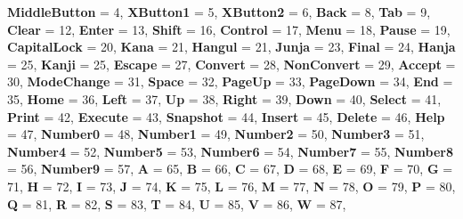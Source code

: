 \begin{DoxyCompactItemize}
{\bfseries Middle\+Button} = 4, 
{\bfseries X\+Button1} = 5, 
{\bfseries X\+Button2} = 6, 
{\bfseries Back} = 8, 
\newline
{\bfseries Tab} = 9, 
{\bfseries Clear} = 12, 
{\bfseries Enter} = 13, 
{\bfseries Shift} = 16, 
\newline
{\bfseries Control} = 17, 
{\bfseries Menu} = 18, 
{\bfseries Pause} = 19, 
{\bfseries Capital\+Lock} = 20, 
\newline
{\bfseries Kana} = 21, 
{\bfseries Hangul} = 21, 
{\bfseries Junja} = 23, 
{\bfseries Final} = 24, 
\newline
{\bfseries Hanja} = 25, 
{\bfseries Kanji} = 25, 
{\bfseries Escape} = 27, 
{\bfseries Convert} = 28, 
\newline
{\bfseries Non\+Convert} = 29, 
{\bfseries Accept} = 30, 
{\bfseries Mode\+Change} = 31, 
{\bfseries Space} = 32, 
\newline
{\bfseries Page\+Up} = 33, 
{\bfseries Page\+Down} = 34, 
{\bfseries End} = 35, 
{\bfseries Home} = 36, 
\newline
{\bfseries Left} = 37, 
{\bfseries Up} = 38, 
{\bfseries Right} = 39, 
{\bfseries Down} = 40, 
\newline
{\bfseries Select} = 41, 
{\bfseries Print} = 42, 
{\bfseries Execute} = 43, 
{\bfseries Snapshot} = 44, 
\newline
{\bfseries Insert} = 45, 
{\bfseries Delete} = 46, 
{\bfseries Help} = 47, 
{\bfseries Number0} = 48, 
\newline
{\bfseries Number1} = 49, 
{\bfseries Number2} = 50, 
{\bfseries Number3} = 51, 
{\bfseries Number4} = 52, 
\newline
{\bfseries Number5} = 53, 
{\bfseries Number6} = 54, 
{\bfseries Number7} = 55, 
{\bfseries Number8} = 56, 
\newline
{\bfseries Number9} = 57, 
{\bfseries A} = 65, 
{\bfseries B} = 66, 
{\bfseries C} = 67, 
\newline
{\bfseries D} = 68, 
{\bfseries E} = 69, 
{\bfseries F} = 70, 
{\bfseries G} = 71, 
\newline
{\bfseries H} = 72, 
{\bfseries I} = 73, 
{\bfseries J} = 74, 
{\bfseries K} = 75, 
\newline
{\bfseries L} = 76, 
{\bfseries M} = 77, 
{\bfseries N} = 78, 
{\bfseries O} = 79, 
\newline
{\bfseries P} = 80, 
{\bfseries Q} = 81, 
{\bfseries R} = 82, 
{\bfseries S} = 83, 
\newline
{\bfseries T} = 84, 
{\bfseries U} = 85, 
{\bfseries V} = 86, 
{\bfseries W} = 87, 

\end{DoxyCompactItemize}
